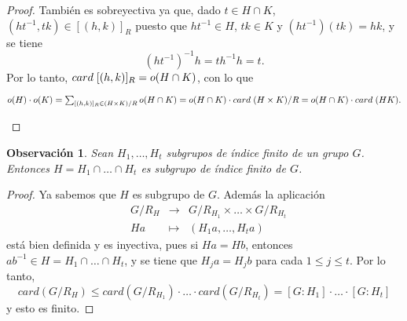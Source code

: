 \documentclass[12pt]{article}
\newtheorem{observation}{Observación}[theorem]
\begin{document}
\begin{proof}
También es sobreyectiva ya que, dado $t \in H \cap K$, $(ht^{-1}, tk) \in [(h,k)]_R$ puesto que $ht^{-1} \in H$, $tk \in K$ y $(ht^{-1})(tk) = hk$, y se tiene $$(ht^{-1})^{-1}h = th^{-1}h = t.$$ Por lo tanto, $card \hspace{0.1cm}[(h,k)]_R = o(H \cap K)$, con lo que \begin{center}$o(H) \cdot o(K) = \sum_{[(h,k)]_R \in (H\times K)/R} o(H \cap K) = o(H\cap K) \cdot card \hspace{0.1cm} (H \times K)/R = o(H \cap K) \cdot card \hspace{0.1cm} (HK).$\end{center}

\end{proof}

\begin{observation}Sean $H_1, \ldots, H_t$ subgrupos de índice finito de un grupo $G$. Entonces $H = H_1 \cap \ldots \cap H_t$ es subgrupo de índice finito de $G$.
\end{observation}
\begin{proof}
Ya sabemos que $H$ es subgrupo de $G$. Además la aplicación $$\begin{array}{rccl}
&G/R_{H} & \longrightarrow & G/R_{H_{1}} \times \ldots \times G/R_{H_{t}}\\
&Ha & \longmapsto &(H_{1}a,\ldots, H_{t}a)
\end{array}$$
está bien definida y es inyectiva, pues si $Ha = Hb$, entonces $ab^{-1} \in H = H_{1}\cap \ldots \cap H_{t}$, y se tiene que $H_{j}a = H_{j}b$ para cada $1\leq j \leq t$. Por lo tanto, $$card(G/R_{H})\leq card(G/R_{H_{1}})\cdot \ldots \cdot card(G/R_{H_{t}}) = \left[ G:H_{1} \right] \cdot \ldots \cdot \left[ G:H_{t} \right]$$ y esto es finito.

\end{proof}
\end{document}
